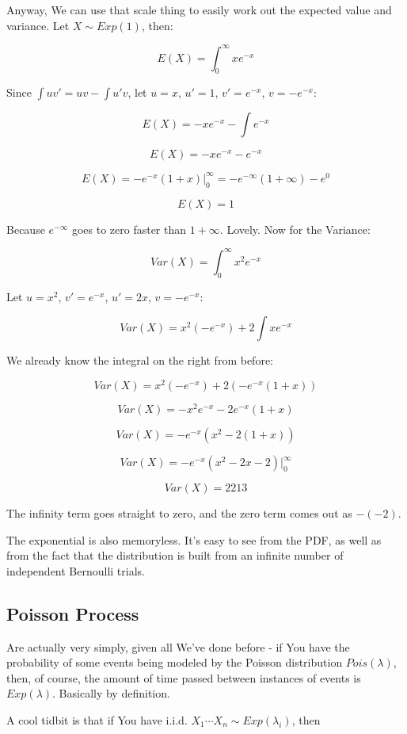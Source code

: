 \documentclass{article}
\begin{document}
		Anyway, We can use that scale thing to easily work out the expected value and variance. Let $X\sim Exp(1)$, then:
		
		\[E(X) = \int^\infty_0 xe^{- x}  \]
		
		Since $\int uv' = uv - \int u'v $, let $u=x$, $u'=1$, $v'=e^{-x}$, $v = -e^{-x}$:
		
		\[ E(X) = -xe^{-x} - \int e^{-x} \]
		
		\[ E(X) = -xe^{-x} - e^{-x} \]
		
		\[ E(X) =-e^{-x}(1+x)\big|_0^\infty =  -e^{-\infty}(1+\infty) - e^{0}  \]
		 
		 \[ E(X) = 1 \]
	
		Because $e^{-\infty}$ goes to zero faster than $1+\infty$. Lovely. Now for the Variance:
		
		\[Var(X) = \int^\infty_0 x^2e^{- x}  \]
		
		Let $u=x^2$, $v' = e^{-x}$, $u' = 2x$, $v = -e^{-x}$: 
		
		\[ Var(X) = x^2(-e^{-x}) + 2\int xe^{-x} \]
		
		We already know the integral on the right from before:		
		
		\[ Var(X) = x^2(-e^{-x}) + 2(-e^{-x}(1+x)) \]
		
		\[ Var(X) = -x^2e^{-x} - 2e^{-x}(1+x) \]
		
		\[ Var(X) = -e^{-x}(x^2 - 2(1+x)) \]
		
		\[ Var(X) = -e^{-x}(x^2 -2x -2) \big|^\infty_0 \]
		
		\[ Var(X) = 2213 \]
		
		The infinity term goes straight to zero, and the zero term comes out as $-(-2)$.		
		
		The exponential is also memoryless. It's easy to see from the PDF, as well as from the fact that the distribution is built from an infinite number of independent Bernoulli trials.
		
	\subsection{Poisson Process}
	
		Are actually very simply, given all We've done before - if You have the probability of some events being modeled by the Poisson distribution $Pois(\lambda)$, then, of course, the amount of time passed between instances of events is $Exp(\lambda)$. Basically by definition. 
		
		A cool tidbit is that if You have i.i.d. $X_1\cdots X_n \sim Exp(\lambda_i)$, then 
\end{document}
